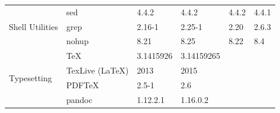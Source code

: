 \begin{table}[!ht]
{\begin{tabular}{ll|l|l|l|l|}
\multicolumn{1}{|l}{\multirow{3}{*}{Shell Utilities}}  & \multicolumn{1}{|l|}{sed}                    & 4.4.2                                                               & 4.4.2                                                             & 4.4.2                                                                  & 4.4.1                                                       \\ \cline{2-6}
\multicolumn{1}{|l}{}                                  & \multicolumn{1}{|l|}{grep}                   & 2.16-1                                                              & 2.25-1                                                            & 2.20                                                                   & 2.6.3                                                       \\ \cline{2-6}
\multicolumn{1}{|l}{}                                  & \multicolumn{1}{|l|}{nohup}                  & 8.21                                                                & 8.25                                                              & 8.22                                                                   & 8.4                                                         \\ \hline
\multicolumn{1}{|l}{\multirow{4}{*}{Typesetting}}      & \multicolumn{1}{|l|}{\TeX}                   & 3.1415926                                                           & 3.14159265                                                        &                                                                        &                                                             \\ \cline{2-6}
\multicolumn{1}{|l}{}                                  & \multicolumn{1}{|l|}{TexLive (\LaTeX)}       & 2013                                                                & 2015                                                              &                                                                        &                                                             \\ \cline{2-6}
\multicolumn{1}{|l}{}                                  & \multicolumn{1}{|l|}{PDF\TeX}                & 2.5-1                                                               & 2.6                                                               &                                                                        &                                                             \\ \cline{2-6}
\multicolumn{1}{|l}{}                                  & \multicolumn{1}{|l|}{pandoc}                 & 1.12.2.1                                                            & 1.16.0.2                                                          &                                                                        &                                                             \\ \hline

\end{tabular}}
\end{table}
